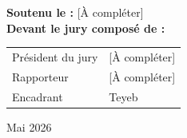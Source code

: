 \begin{titlepage}
    \vspace{1cm}

    \begin{minipage}{0.88\textwidth}
        \centering
        \textbf{Soutenu le :} [À compléter]\\[0.2cm]
        \textbf{Devant le jury composé de :}\\[0.2cm]
        \begin{tabular}{L{5.4cm}L{7.2cm}}
            Président du jury & [À compléter] \\
            Rapporteur & [À compléter] \\
            Encadrant & Teyeb \\
        \end{tabular}
    \end{minipage}

    \vspace{0.8cm}
    {\large Mai 2026}
\end{titlepage}

